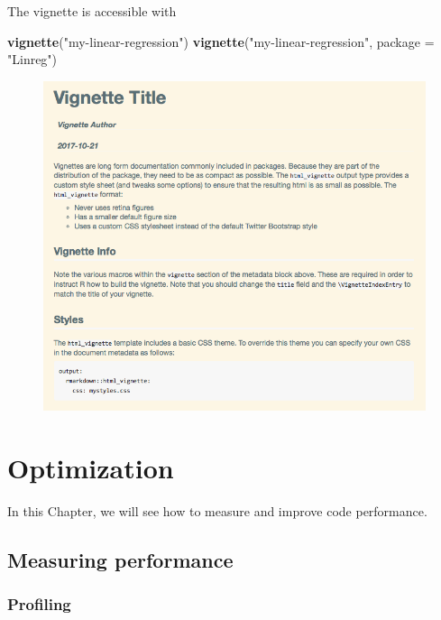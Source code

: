 \documentclass[]{book}
\newenvironment{Shaded}{\begin{snugshade}}{\end{snugshade}}
\newcommand{\KeywordTok}[1]{\textcolor[rgb]{0.13,0.29,0.53}{\textbf{#1}}}
\newcommand{\DataTypeTok}[1]{\textcolor[rgb]{0.13,0.29,0.53}{#1}}
\newcommand{\StringTok}[1]{\textcolor[rgb]{0.31,0.60,0.02}{#1}}
\newcommand{\NormalTok}[1]{#1}
\theoremstyle{definition}
\theoremstyle{definition}
\theoremstyle{definition}
\theoremstyle{remark}
\begin{document}
The vignette is accessible with

\begin{Shaded}
\begin{Highlighting}[]
\KeywordTok{vignette}\NormalTok{(}\StringTok{"my-linear-regression"}\NormalTok{)}
\KeywordTok{vignette}\NormalTok{(}\StringTok{"my-linear-regression"}\NormalTok{, }\DataTypeTok{package =} \StringTok{"Linreg"}\NormalTok{)}
\end{Highlighting}
\end{Shaded}

\begin{figure}

{\centering \includegraphics{images/ch3_vignette_html} 

}

\end{figure}

\chapter{Optimization}\label{optimization}

In this Chapter, we will see how to measure and improve code
performance.

\section{Measuring performance}\label{measuring-performance}

\subsection{Profiling}\label{profiling}
\end{document}
